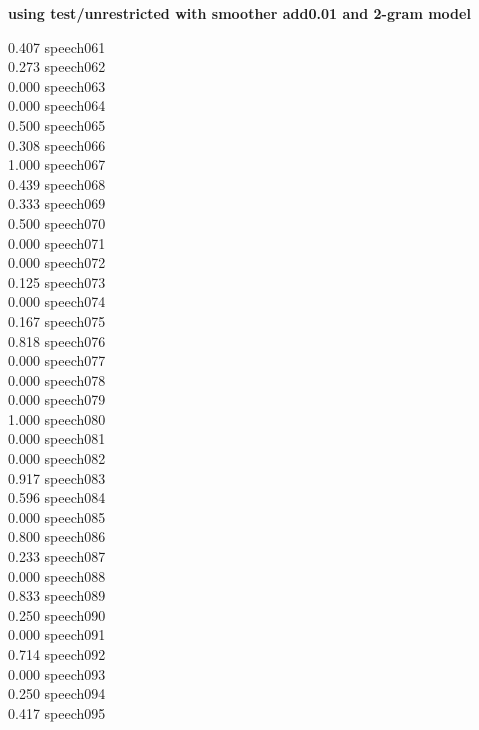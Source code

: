\documentclass[10pt]{article}
\begin{document}
\begin{enumerate}
\begin{enumerate}
            \textbf{using test/unrestricted with smoother add0.01 and 2-gram model}            
            \begin{multicols}{5}
            0.407 speech061\\
            0.273 speech062\\
            0.000 speech063\\
            0.000 speech064\\
            0.500 speech065\\
            0.308 speech066\\
            1.000 speech067\\
            0.439 speech068\\
            0.333 speech069\\
            0.500 speech070\\
            0.000 speech071\\
            0.000 speech072\\
            0.125 speech073\\
            0.000 speech074\\
            0.167 speech075\\
            0.818 speech076\\
            0.000 speech077\\
            0.000 speech078\\
            0.000 speech079\\
            1.000 speech080\\
            0.000 speech081\\
            0.000 speech082\\
            0.917 speech083\\
            0.596 speech084\\
            0.000 speech085\\
            0.800 speech086\\
            0.233 speech087\\
            0.000 speech088\\
            0.833 speech089\\
            0.250 speech090\\
            0.000 speech091\\
            0.714 speech092\\
            0.000 speech093\\
            0.250 speech094\\
            0.417 speech095\\

\end{multicols}
\end{enumerate}
\end{enumerate}
\end{document}
